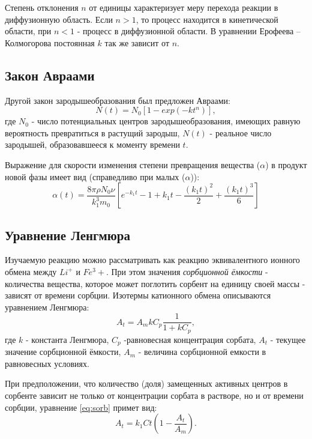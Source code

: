 \documentclass[a4paper,12pt]{article} %
\begin{document}
Степень отклонения $n$ от единицы характеризует меру перехода реакции в диффузионную область. Если $n>1$, то процесс находится в кинетической области, при $n<1$ - процесс в диффузионной области. В уравнении Ерофеева – Колмогорова постоянная $k$ так же зависит от $n$.

\subsection{Закон Авраами}
Другой закон зародышеобразования был предложен Авраами:
\begin{equation}
    N(t) = N_0[1-exp(-kt^n)],
\end{equation}
где $N_0$ - число потенциальных центров зародышеобразования, имеющих равную вероятность превратиться в растущий зародыш, $N(t)$ -  реальное число зародышей, образовавшееся к моменту времени $t$.

Выражение для скорости изменения степени превращения вещества ($\alpha$) в продукт новой фазы имеет вид (справедливо при малых ($\alpha$)):
\begin{equation*}
    \alpha(t) =\frac{8\pi \rho N_0\nu}{k_1^3m_0}[e^{-k_1t}-1+k_1t-\frac{(k_1t)^2}{2}+\frac{(k_1t)^3}{6}]
\end{equation*}
\subsection{Уравнение Ленгмюра}\par 
Изучаемую реакцию можно рассматривать как реакцию эквивалентного ионного обмена между $Li^+$ и $Fe^3+$. При этом значения \textit{сорбционной ёмкости} - количества вещества, которое может поглотить сорбент на единицу своей массы - зависят от времени сорбции. Изотермы катионного обмена описываются уравнением Ленгмюра:
\begin{equation}
    A_t = A_mkC_p\frac{1}{1+kC_p},
    \label{eq:sorb}
\end{equation}
где $k$ - константа Ленгмюра, $C_p$ -равновесная концентрация сорбата, $A_t$ - текущее значение сорбционной ёмкости, $A_m$ - величина сорбционной емкости в равновесных условиях.

При предположении, что количество (доля) замещенных активных центров в сорбенте зависит не только от концентрации сорбата в растворе, но и от времени сорбции, уравнение \eqref{eq:sorb} примет вид: 
\begin{equation*}
    A_t = k_1Ct(1-\frac{A_t}{A_m}).
\end{equation*}
\end{document}
